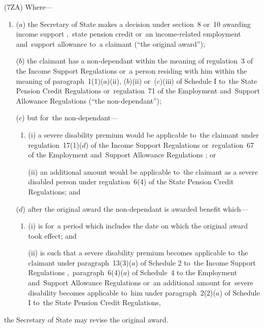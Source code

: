 \documentclass[12pt,a4paper]{article}
\begin{document}
(7ZA) Where—
\begin{enumerate}\item[]
($a$) the Secretary of State makes a decision under section~8 or~10 awarding income support%
,~state pension credit or~an income-related employment and~support allowance  %
to~a claimant (“the original award”);

($b$) the claimant has a non-dependant within the meaning of regulation~3 of the Income Support Regulations or~a person residing with him within the meaning of paragraph~1(1)($a$)(ii), ($b$)(ii)  or~($c$)(iii)  of Schedule I to~the State Pension Credit Regulations 
or~regulation~71 of the Employment and~Support Allowance Regulations  %
(“the non-dependant”);

($c$) but for~the non-dependant—
\begin{enumerate}\item[]
(i) a severe disability premium would be applicable to~the claimant under regulation~17(1)($d$)  of the Income Support Regulations
or~regulation~67 of the Employment and~Support Allowance Regulations%
; or

(ii)  an additional amount would be applicable to~the claimant as a severe disabled person under regulation~6(4) of the State Pension Credit Regulations; and
\end{enumerate}

($d$) after the original award the non-dependant is awarded benefit which—
\begin{enumerate}\item[]
(i) is for~a period which includes the date on which the original award took effect; and

(ii)  is such that a severe disability premium becomes applicable to~the claimant under paragraph~13(3)($a$)  of Schedule 2 to~the Income Support Regulations%
,~paragraph~6(4)($a$)  of Schedule~4 to the Employment and~Support Allowance Regulations  %
or~an additional amount for~severe disability becomes applicable to~him under paragraph~2(2)($a$)  of Schedule I to~the State Pension Credit Regulations,
\end{enumerate}
\end{enumerate}
the Secretary of State may revise the original award.
\end{document}
